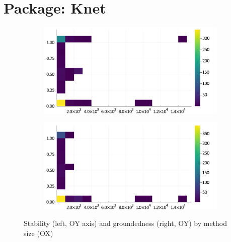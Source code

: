 \section*{Package: Knet}
\begin{figure}[h]
     \begin{subfigure}[b]{0.49\textwidth}
       \includegraphics[width=\textwidth]{figs/all-package-graphs/Knet-size-vs-stable.pdf}
     \end{subfigure}
     \begin{subfigure}[b]{0.49\textwidth}
       \includegraphics[width=\textwidth]{figs/all-package-graphs/Knet-size-vs-grounded.pdf}
     \end{subfigure}
\caption{Stability (left, OY axis) and groundedness (right, OY) by method size (OX)}%
%
\label{figs:size:Knet}
\end{figure}

